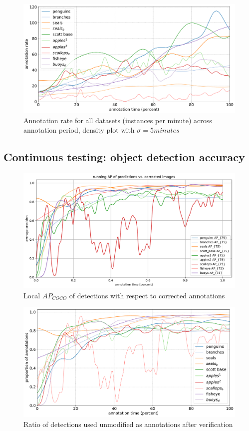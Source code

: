 \begin{figure}[H]
\centering
\includegraphics[width=1.0\linewidth]{charts/summaries/instance_rates.pdf}
\caption{ Annotation rate for all datasets (instances per minute) across annotation period, density plot with $\sigma=5minutes$ }
\label{fig:annotation_rate}
\end{figure}


\subsection{Continuous testing: object detection accuracy}


\begin{figure}[H]
\centering
\includegraphics[width=1.0\linewidth]{charts/running_maps/overall.pdf}
\caption{ Local $AP_{COCO}$ of detections with respect to corrected annotations }
\label{fig:average_precision_test}
\end{figure}


\begin{figure}[H]
\centering
\includegraphics[width=1.0\linewidth]{charts/summaries/positive_ratio.pdf}
\caption{ Ratio of detections used unmodified as annotations after verification }
\label{fig:positive_ratio}
\end{figure}

